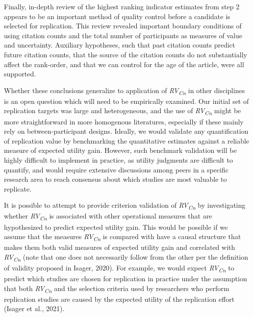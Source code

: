 \documentclass[
  man,floatsintext]{apa6}
\begin{document}
Finally, in-depth review of the highest ranking indicator estimates from step 2 appears to be an important method of quality control before a candidate is selected for replication. This review revealed important boundary conditions of using citation counts and the total number of participants as measures of value and uncertainty. Auxiliary hypotheses, such that past citation counts predict future citation counts, that the source of the citation counts do not substantially affect the rank-order, and that we can control for the age of the article, were all supported.

Whether these conclusions generalize to application of \emph{RV\textsubscript{Cn}} in other disciplines is an open question which will need to be empirically examined. Our initial set of replication targets was large and heterogeneous, and the use of \emph{RV\textsubscript{Cn}} might be more straightforward in more homogenous literatures, especially if these mainly rely on between-participant designs. Ideally, we would validate any quantification of replication value by benchmarking the quantitative estimates against a reliable measure of expected utility gain. However, such benchmark validation will be highly difficult to implement in practice, as utility judgments are difficult to quantify, and would require extensive discussions among peers in a specific research area to reach consensus about which studies are most valuable to replicate.

It is possible to attempt to provide criterion validation of \emph{RV\textsubscript{Cn}} by investigating whether \emph{RV\textsubscript{Cn}} is associated with other operational measures that are hypothesized to predict expected utility gain. This would be possible if we assume that the measures \emph{RV\textsubscript{Cn}} is compared with have a causal structure that makes them both valid measures of expected utility gain and correlated with \emph{RV\textsubscript{Cn}} (note that one does not necessarily follow from the other per the definition of validity proposed in Isager, 2020). For example, we would expect \emph{RV\textsubscript{Cn}} to predict which studies are chosen for replication in practice under the assumption that both \emph{RV\textsubscript{Cn}} and the selection criteria used by researchers who perform replication studies are caused by the expected utility of the replication effort (Isager et al., 2021).
\end{document}
